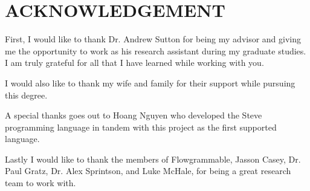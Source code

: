 \chapter*{ACKNOWLEDGEMENT}

First, I would like to thank Dr. Andrew Sutton for being my advisor and giving
me the opportunity to work as his research assistant during my graduate studies.
I am truly grateful for all that I have learned while working with you.

I would also like to thank my wife and family for their support while pursuing
this degree.

A special thanks goes out to Hoang Nguyen who developed the Steve programming
language in tandem with this project as the first supported language.

Lastly I would like to thank the members of Flowgrammable, Jasson Casey, Dr.
Paul Gratz, Dr. Alex Sprintson, and Luke McHale, for being a great research
team to work with.
